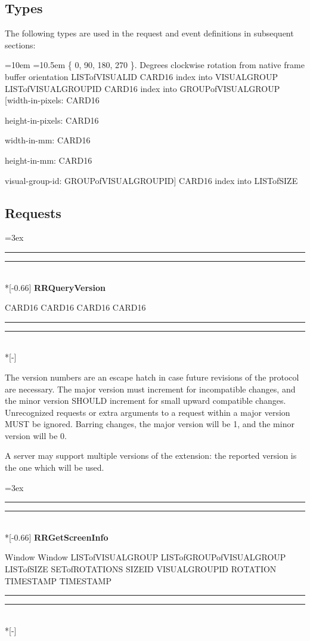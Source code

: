 \documentclass[twocolumn]{article}
\newlength{\bracketwidth}
\newlength{\croplength}
\newlength{\cropweight}
\newenvironment{Xtype}{%
  \begin{list}{}{%
    \newcommand{\Xenum}[1]{%
      \settowidth{\bracketwidth}{\{}%
      \item[##1]\hspace*{-2\bracketwidth}%
    }
    \newcommand{\Xstruct}[1]{%
      \settowidth{\bracketwidth}{[}%
      \item[##1]\hspace*{-2\bracketwidth}%
    }
    \newcommand{\Xdecl}[1]{\item[##1]}
    \labelwidth=10em
    \leftmargin=10.5em
    \itemindent=0pt
    \labelsep=0pt
    \parsep=0pt
    \renewcommand{\makelabel}[1]{##1:~}%
  }}
  {\end{list}}
\newenvironment{Xrequest}[1]{%
  \croplength=3ex
  \hspace*{1.5\croplength}\begin{minipage}{\textwidth}
  \cropweight=0.25pt
  \hspace*{-1.5\croplength}%
  \rule[-\croplength]{\cropweight}{\croplength}%
  \rule[-\cropweight]{\croplength}{\cropweight}\\*[-0.66\croplength]%
  \textbf{#1}%
  \begin{list}{}{%
    \renewcommand{\makelabel}[1]{{##1:~}}%
    \newcommand{\Xparam}[1]{\item[\textit{##1}]}
    \newcommand{\Xreply}{\\\hspace*{-\leftmargin}$\rightarrow$}
    \newcommand{\Xerror}[1]{\vspace{5pt}\item[Errors] \texttt{##1}}
    \labelwidth=0pt
    \labelsep=0pt
    \parsep=0pt
    \itemsep=0pt
    \listparindent=0pt
  }}
  {\end{list}%
  \vspace{-\baselineskip}%
  \hspace*{-1.5\croplength}%
  \rule[\croplength]{\cropweight}{\croplength}%
  \rule[\croplength]{\croplength}{\cropweight}\\*[-\croplength]%
  \end{minipage}\vspace*{-\baselineskip}}
\begin{document}
\subsection{Types}

The following types are used in the request and event definitions in
subsequent sections:

\begin{Xtype}
 \{ 0, 90, 180, 270 \}. Degrees clockwise rotation
from native frame buffer orientation
 LISTofVISUALID
 CARD16 index into VISUALGROUP
 LISTofVISUALGROUPID
 CARD16 index into GROUPofVISUALGROUP
 [width-in-pixels: CARD16\par
height-in-pixels: CARD16\par
width-in-mm: CARD16\par
height-in-mm: CARD16\par
visual-group-id: GROUPofVISUALGROUPID]
 CARD16 index into LISTofSIZE
\end{Xtype}

\subsection{Requests}

\begin{Xrequest}{RRQueryVersion}
 CARD16
 CARD16
\Xreply
{} CARD16
 CARD16
\end{Xrequest}

The version numbers are an escape hatch in case future revisions of
the protocol are necessary.  The major version must increment for
incompatible changes, and the minor version SHOULD increment for small
upward compatible changes. Unrecognized requests or extra arguments to
a request within a major version MUST be ignored.  Barring changes,
the major version will be 1, and the minor version will be 0.

A server may support multiple versions of the extension: the reported
version is the one which will be used.

\begin{Xrequest}{RRGetScreenInfo}
 Window
\Xreply
{} Window
 LISTofVISUALGROUP
 LISTofGROUPofVISUALGROUP
 LISTofSIZE
 SETofROTATIONS
 SIZEID
 VISUALGROUPID
 ROTATION
 TIMESTAMP
 TIMESTAMP
\end{Xrequest}
\end{document}
